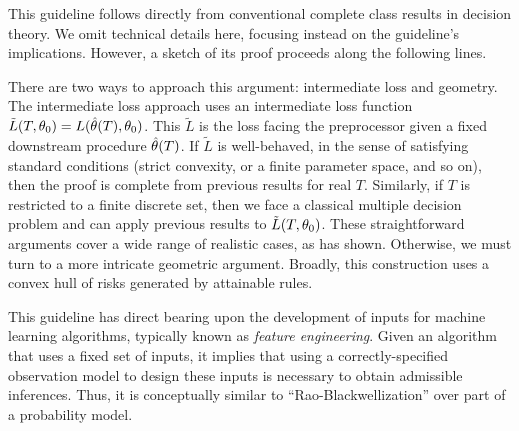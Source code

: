 This guideline follows directly from conventional complete class results in decision theory.
We omit technical details here, focusing instead on the guideline's implications.
However, a sketch of its proof proceeds along the following lines.

There are two ways to approach this argument: intermediate loss and geometry.
The intermediate loss approach uses an intermediate loss function $\tilde{L}(T, \theta_0) = L(\hat{\theta}(T), \theta_0)$.
This $\tilde{L}$ is the loss facing the preprocessor given a fixed downstream procedure $\hat{\theta}(T)$.
If $\tilde{L}$ is well-behaved, in the sense of satisfying standard conditions (strict convexity, or a finite parameter space, and so on), then the proof is complete from previous results for real $T$.
Similarly, if $T$ is restricted to a finite discrete set, then we face a classical multiple decision problem and can apply previous results to $\tilde{L}(T, \theta_0)$.
These straightforward arguments cover a wide range of realistic cases, as \cite{Berger1985} has shown.
Otherwise, we must turn to a more intricate geometric argument.
Broadly, this construction uses a convex hull of risks generated by attainable rules.

This guideline has direct bearing upon the development of inputs for machine learning algorithms, typically known as \emph{feature engineering}.
Given an algorithm that uses a fixed set of inputs, it implies that using a correctly-specified observation model to design these inputs is necessary to obtain admissible inferences.
Thus, it is conceptually similar to ``Rao-Blackwellization'' over part of a probability model.

